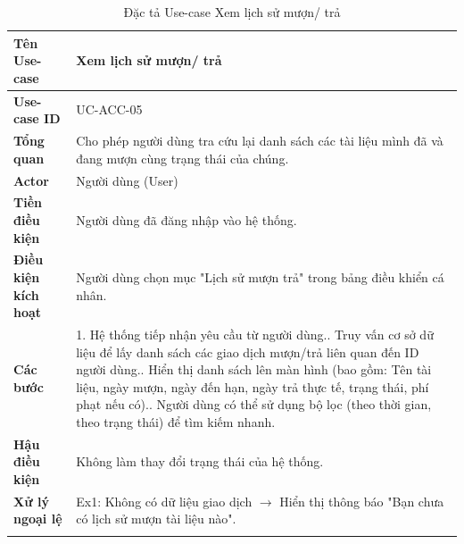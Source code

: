 \begin{longtable}{|p{3.5cm}|p{11.5cm}|}
    \hline
    \textbf{Tên Use-case} & \textbf{Xem lịch sử mượn/ trả} \\
    \hline
    \textbf{Use-case ID} & UC-ACC-05 \\
    \hline
    \textbf{Tổng quan} & Cho phép người dùng tra cứu lại danh sách các tài liệu mình đã và đang mượn cùng trạng thái của chúng. \\
    \hline
    \textbf{Actor} & Người dùng (User) \\
    \hline
    \textbf{Tiền điều kiện} & Người dùng đã đăng nhập vào hệ thống. \\
    \hline
    \textbf{Điều kiện kích hoạt} & Người dùng chọn mục "Lịch sử mượn trả" trong bảng điều khiển cá nhân. \\
    \hline
    \textbf{Các bước} & 
    1. Hệ thống tiếp nhận yêu cầu từ người dùng.\newline
    2. Truy vấn cơ sở dữ liệu để lấy danh sách các giao dịch mượn/trả liên quan đến ID người dùng.\newline
    3. Hiển thị danh sách lên màn hình (bao gồm: Tên tài liệu, ngày mượn, ngày đến hạn, ngày trả thực tế, trạng thái, phí phạt nếu có).\newline
    4. Người dùng có thể sử dụng bộ lọc (theo thời gian, theo trạng thái) để tìm kiếm nhanh. \\
    \hline
    \textbf{Hậu điều kiện} & Không làm thay đổi trạng thái của hệ thống. \\
    \hline
    \textbf{Xử lý ngoại lệ} & 
    Ex1: Không có dữ liệu giao dịch $\rightarrow$ Hiển thị thông báo "Bạn chưa có lịch sử mượn tài liệu nào". \\
    \hline
    \caption{Đặc tả Use-case Xem lịch sử mượn/ trả}
\end{longtable}

